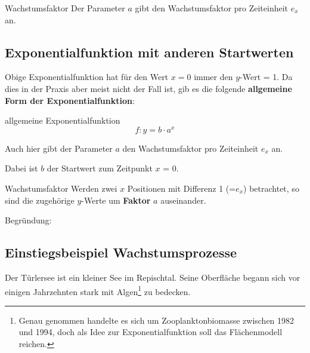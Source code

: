 


\begin{bemerkung}{Wachstumsfaktor}{}
Der Parameter $a$ gibt den Wachstumsfaktor pro Zeiteinheit $e_x$ an.
\end{bemerkung}

\newpage

\subsection{Exponentialfunktion mit anderen Startwerten}

Obige Exponentialfunktion hat für den Wert $x=0$ immer den $y$-Wert = 1. Da dies in der Praxis aber meist nicht der Fall ist, gib es die folgende \textbf{allgemeine Form der Exponentialfunktion}:

\begin{definition}{allgemeine Exponentialfunktion}{}
$$f: y = b\cdot{}a^x$$

Auch hier gibt der Parameter $a$ den Wachstumsfaktor pro Zeiteinheit $e_x$ an.

Dabei ist $b$ der Startwert zum Zeitpunkt $x$ = 0.
\end{definition}



\begin{bemerkung}{Wachstumsfaktor}{}{}
Werden zwei $x$ Positionen mit Differenz 1 (=$e_x$) betrachtet, so sind
die zugehörige $y$-Werte um \textbf{Faktor} $a$ auseinander.
\end{bemerkung}

Begründung:
\newpage



\subsection{Einstiegsbeispiel Wachstumsprozesse}
Der Türlersee ist ein kleiner See im Repischtal. Seine Oberfläche
begann sich vor einigen Jahrzehnten stark mit Algen\footnote{Genau
  genommen handelte es sich um Zooplanktonbiomasse zwischen 1982 und 1994, doch als
  Idee zur Exponentialfunktion soll das Flächenmodell reichen.} zu bedecken.

